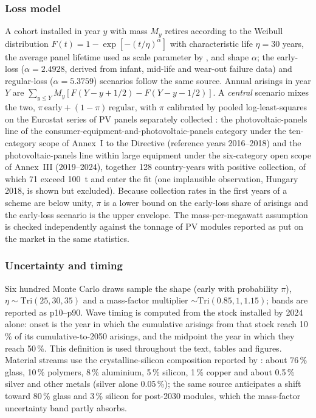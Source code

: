 \documentclass[a4paper,fleqn]{cas-sc}
\begin{document}
\subsubsection{Loss model} A cohort installed in year $y$ with mass $M_y$ retires according to the Weibull distribution $F(t)=1-\exp[-(t/\eta)^{\alpha}]$ with characteristic life $\eta=30$ years, the average panel lifetime used as scale parameter by \citet{irena2016}, and shape $\alpha$; the early-loss ($\alpha=2.4928$, derived from infant, mid-life and wear-out failure data) and regular-loss ($\alpha=5.3759$) scenarios follow the same source. Annual arisings in year $Y$ are $\sum_{y\le Y}M_y[F(Y-y+1/2)-F(Y-y-1/2)]$. A \emph{central} scenario mixes the two, $\pi\,\text{early}+(1-\pi)\,\text{regular}$, with $\pi$ calibrated by pooled log-least-squares on the Eurostat series of PV panels separately collected \citep{eurostat_weee}: the photovoltaic-panels line of the consumer-equipment-and-photovoltaic-panels category under the ten-category scope of Annex~I to the Directive (reference years 2016--2018) and the photovoltaic-panels line within large equipment under the six-category open scope of Annex~III (2019--2024), together 128 country-years with positive collection, of which 71 exceed \SI{100}{t} and enter the fit (one implausible observation, Hungary 2018, is shown but excluded). Because collection rates in the first years of a scheme are below unity, $\pi$ is a lower bound on the early-loss share of arisings and the early-loss scenario is the upper envelope. The mass-per-megawatt assumption is checked independently against the tonnage of PV modules reported as put on the market in the same statistics.

\subsubsection{Uncertainty and timing} Six hundred Monte Carlo draws sample the shape (early with probability $\pi$), $\eta\sim\mathrm{Tri}(25,30,35)$ and a mass-factor multiplier $\sim\mathrm{Tri}(0.85,1,1.15)$; bands are reported as p10--p90. Wave timing is computed from the stock installed by 2024 alone: onset is the year in which the cumulative arisings from that stock reach 10\,\% of its cumulative-to-2050 arisings, and the midpoint the year in which they reach 50\,\%. This definition is used throughout the text, tables and figures. Material streams use the crystalline-silicon composition reported by \citet{irena2016}: about 76\,\% glass, 10\,\% polymers, 8\,\% aluminium, 5\,\% silicon, 1\,\% copper and about 0.5\,\% silver and other metals (silver alone 0.05\,\%); the same source anticipates a shift toward 80\,\% glass and 3\,\% silicon for post-2030 modules, which the mass-factor uncertainty band partly absorbs.
\end{document}
